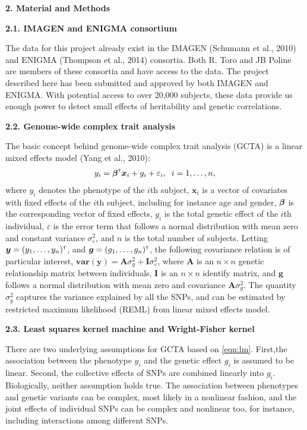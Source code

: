 \documentclass[12pt]{article}
\newcommand{\var}{\mathbf{var}}
\newcommand{\trans}{^{\mbox{\tiny {\sf T}}}}
\newcommand{\Abf}{{\bm A}}
\newcommand{\Ibf}{{\bm I}}
\newcommand{\gbf}{{\bm g}}
\newcommand{\xbf}{{\bm x}}
\newcommand{\ybf}{{\bm y}}
\newcommand{\greekbold}[1]{\mbox{\boldmath $#1$}}
\newcommand{\betabf}{\greekbold{\beta}}
\begin{document}
\noindent
{\large \textbf{2. Material and Methods}}
\medskip

\noindent
\textbf{2.1. IMAGEN and ENIGMA consortium}
\smallskip

\noindent
The data for this project already exist in the IMAGEN (Schumann et al., 2010) and ENIGMA (Thompson et al., 2014) consortia. Both R. Toro and JB Poline are members of these consortia and have access to the data. The project described here has been submitted and approved by both IMAGEN and ENIGMA. With potential access to over 20,000 subjects, these data provide us enough power to detect small effects of heritability and genetic correlations.
\medskip


\noindent
\textbf{2.2. Genome-wide complex trait analysis}
\smallskip

\noindent
The basic concept behind genome-wide complex trait analysis (GCTA) is a linear mixed effects model (Yang et al., 2010):
\begin{eqnarray} \label{eqn:lm}
y_i = \betabf\trans \xbf_i + g_i + \varepsilon_i, \;\; i = 1, \ldots, n,
\end{eqnarray}
where $y_i$ denotes the phenotype of the $i$th subject, $\xbf_i$ is a vector of covariates with fixed effects of the $i$th subject, including for instance age and gender, $\betabf$ is the corresponding vector of fixed effects, $g_i$ is the total genetic effect of the $i$th individual, $\varepsilon$ is the error term that follows a normal distribution with mean zero and constant variance $\sigma^2_\varepsilon$, and $n$ is the total number of subjects. Letting $\ybf = (y_1, \ldots, y_n)\trans$, and $\gbf = (g_1, \ldots, g_n)\trans$, the following covariance relation is of particular interest, $\var(\ybf) = \Abf \sigma^2_g + \Ibf \sigma^2_\varepsilon$,
where $\Abf$ is an $n \times n$ genetic relationship matrix between individuals, $\Ibf$ is an $n \times n$ identify matrix, and $\gbf$ follows a normal distribution with mean zero and covariance $\Abf \sigma^2_g$. The quantity $\sigma^2_g$ captures the variance explained by all the SNPs, and can be estimated by restricted maximum likelihood (REML) from linear mixed effects model. 
\medskip


\noindent
\textbf{2.3. Least squares kernel machine and Wright-Fisher kernel}
\smallskip

\noindent
There are two underlying assumptions for GCTA based on \eqref{eqn:lm}. First,the association between the phenotype $y_i$ and the genetic effect $g_i$ is assumed to be linear. Second, the collective effects of SNPs are combined linearly into $g_i$. Biologically, neither assumption holds true. The association between phenotypes and genetic variants can be complex, most likely in a nonlinear fashion, and the joint effects of individual SNPs can be complex and nonlinear too, for instance, including interactions among different SNPs. 
\end{document}
